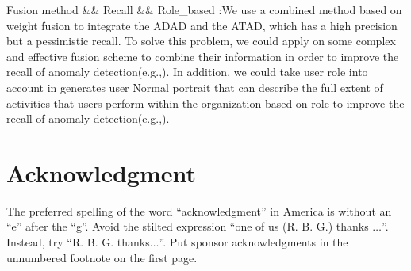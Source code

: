 \documentclass[conference]{IEEEtran}
\begin{document}
Fusion method \&\& Recall \&\& Role\_based	:We use a combined method based on weight fusion to integrate the ADAD and the ATAD, which has a high precision but a pessimistic recall. To solve this problem, we could apply on some complex and effective fusion scheme to combine their information in order to improve the recall of anomaly detection(e.g.,\cite{b49}).  In addition, we could take user role into account in generates user Normal portrait that can describe the full extent of activities that users perform within the organization based on role to improve the recall of anomaly detection(e.g.,\cite{b50}).   	
\fi

\section*{Acknowledgment}

The preferred spelling of the word ``acknowledgment'' in America is without 
an ``e'' after the ``g''. Avoid the stilted expression ``one of us (R. B. 
G.) thanks $\ldots$''. Instead, try ``R. B. G. thanks$\ldots$''. Put sponsor 
acknowledgments in the unnumbered footnote on the first page.
\end{document}
